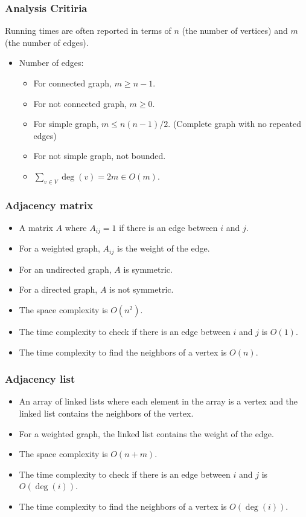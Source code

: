 \documentclass[letterpaper,12pt]{article}
\begin{document}
\subsubsection{Analysis Critiria}
Running times are often reported in terms of $n$ (the number of vertices) and $m$ (the number of edges). \begin{itemize}
    \item Number of edges: \begin{itemize}
        \item For connected graph, $m\geq n-1$.
        \item For not connected graph, $m\geq 0$.
        \item For simple graph, $m\leq n(n-1)/2$. (Complete graph with no repeated edges)
        \item For not simple graph, not bounded.
        \item $\sum_{v\in V}\deg(v)=2m \in O(m)$.
    \end{itemize}
\end{itemize}
\subsubsection{Adjacency matrix}
\begin{itemize}
    \item A matrix $A$ where $A_{ij}=1$ if there is an edge between $i$ and $j$.
    \item For a weighted graph, $A_{ij}$ is the weight of the edge.
    \item For an undirected graph, $A$ is symmetric.
    \item For a directed graph, $A$ is not symmetric.
    \item The space complexity is $O(n^2)$.
    \item The time complexity to check if there is an edge between $i$ and $j$ is $O(1)$.
    \item The time complexity to find the neighbors of a vertex is $O(n)$.
\end{itemize}
\subsubsection{Adjacency list}
\begin{itemize}
    \item An array of linked lists where each element in the array is a vertex and the linked list contains the neighbors of the vertex.
    \item For a weighted graph, the linked list contains the weight of the edge.
    \item The space complexity is $O(n+m)$.
    \item The time complexity to check if there is an edge between $i$ and $j$ is $O(\deg(i))$.
    \item The time complexity to find the neighbors of a vertex is $O(\deg(i))$.
\end{itemize}
\end{document}
